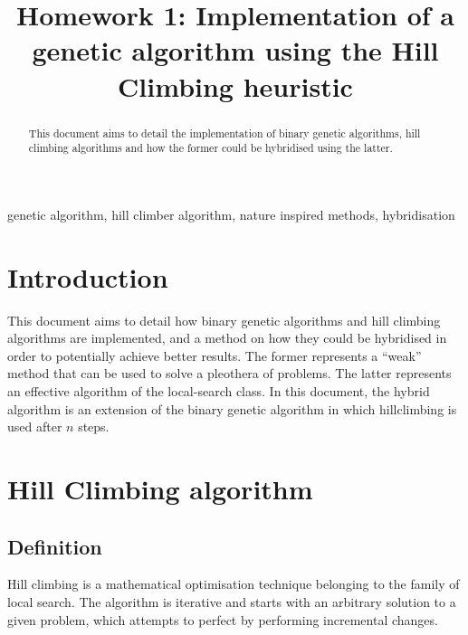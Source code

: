 \documentclass[conference]{IEEEtran}
\begin{document}
\title{Homework 1: Implementation of a genetic algorithm using the Hill Climbing heuristic}

\author{
}

\maketitle


\begin{abstract}
This document aims to detail the implementation of binary genetic algorithms, hill climbing algorithms
and how the former could be hybridised using the latter.
\end{abstract}

\begin{IEEEkeywords}
genetic algorithm, hill climber algorithm, nature inspired methods, hybridisation
\end{IEEEkeywords}

\section{Introduction}
This document aims to detail how binary genetic algorithms and hill climbing algorithms are implemented, and a method
on how they could be hybridised in order to potentially achieve better results. The former represents a ``weak'' method
that can be used to solve a pleothera of problems. The latter represents an effective algorithm of the local-search class.
In this document, the hybrid algorithm is an extension of the binary genetic algorithm in which hillclimbing is used after
$n$ steps.

\section{Hill Climbing algorithm}

\subsection{Definition}
Hill climbing is a mathematical optimisation technique belonging to the family of local search. The algorithm is iterative
and starts with an arbitrary solution to a given problem, which attempts to perfect by performing incremental changes.
\end{document}
